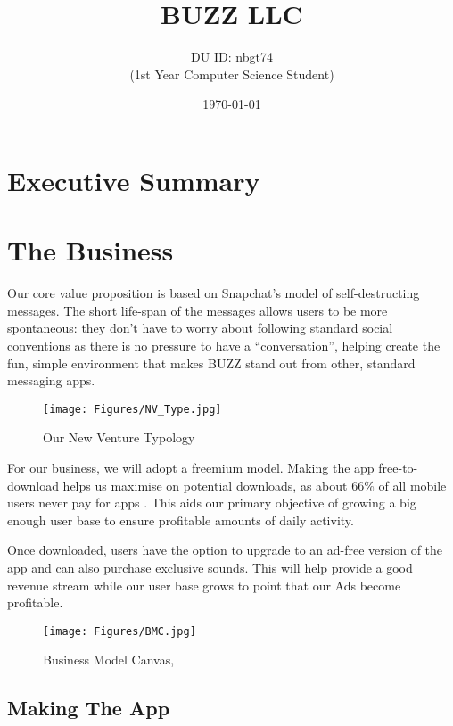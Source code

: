 \documentclass[12pt]{article}
\title{BUZZ LLC}
\author{DU ID: nbgt74 \\(1st Year Computer Science Student)}
\date{\today}
\begin{document}
\maketitle


\tableofcontents
\clearpage


\section{Executive Summary}
 


\newpage

\section{The Business}

Our core value proposition is based on Snapchat’s model of self-destructing messages. The short life-span of the messages allows users to be more spontaneous: they don’t have to worry about following standard social conventions as there is no pressure to have a “conversation”, helping create the fun, simple environment that makes BUZZ stand out from other, standard messaging apps.

\begin{figure}[!h]
    \centering
    \texttt{[image: Figures/NV\_Type.jpg]}
    \caption{Our New Venture Typology \cite{Burns2014} }
    \label{fig:nv type}
\end{figure}

For our business, we will adopt a freemium model. Making the app free-to-download helps us maximise on potential downloads, as about 66\% of all mobile users never pay for apps \cite{eMarketer2015} . This aids our primary objective of growing a big enough user base to ensure profitable amounts of daily activity.

 Once downloaded, users have the option to upgrade to an ad-free version of the app and can also purchase exclusive sounds. This will help provide a good revenue stream while our user base grows to point that our Ads become profitable.

\begin{figure}
    \centering
    \texttt{[image: Figures/BMC.jpg]}
    \caption{Business Model Canvas, \cite{Osterwalder2010}}
    \label{fig:bmc}
\end{figure}

\subsection{Making The App}
\end{document}

